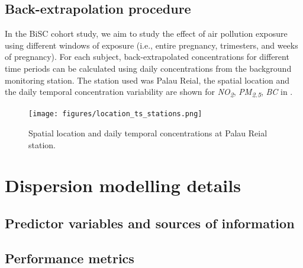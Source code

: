 \documentclass{article}
\begin{document}
\newpage
\subsection{Back-extrapolation procedure}

In the BiSC cohort study, we aim to study the effect of air pollution exposure using different windows of exposure (i.e., entire pregnancy, trimesters, and weeks of pregnancy). For each subject, back-extrapolated concentrations for different time periods can be calculated using daily concentrations from the background monitoring station. The station used was Palau Reial, the spatial location and the daily temporal concentration variability are shown for \textit{NO\textsubscript{2}}, \textit{PM\textsubscript{2.5}}, \textit{BC} in \textbf{}.


\renewcommand{\thefigure}{S\arabic{figure}}

\captionsetup[figure]{skip=6pt} %
\begin{figure}[!htb]
    \centering
    \texttt{[image: figures/location\_ts\_stations.png]} %
    \caption{Spatial location and daily temporal concentrations at Palau Reial station.}
    \label{FigureS1} %
\end{figure}



\newpage


\section{Dispersion modelling details}

\subsection{Predictor variables and sources of information}

\subsection{Performance metrics}
\end{document}
